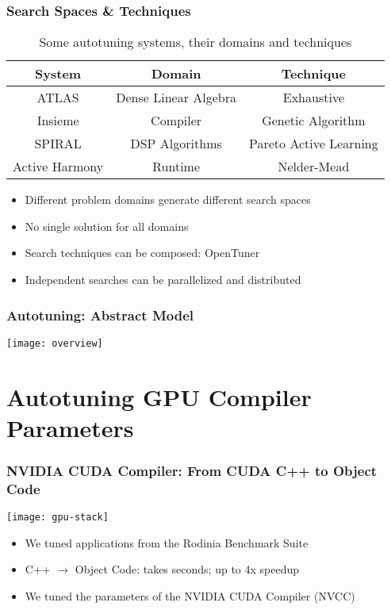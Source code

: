 \documentclass[10pt, compress, aspectratio=169, xcolor=table]{beamer}
\begin{document}
\begin{frame}
    \frametitle{Search Spaces \& Techniques}
    \begin{table}[]
        \centering
        \begin{tabular}{@{}ccc@{}}
            \toprule
            System & Domain & Technique \\ \midrule
            ATLAS & Dense Linear Algebra & Exhaustive \\
            Insieme & Compiler & Genetic Algorithm \\
            SPIRAL & DSP Algorithms & Pareto Active Learning \\
            Active Harmony & Runtime & Nelder-Mead \\ \bottomrule
        \end{tabular}
        \caption{Some autotuning systems, their domains and techniques}
    \end{table}

    \begin{itemize}
        \item Different \alert{problem domains} generate different \alert{search spaces}
        \item \alert{No single solution} for all domains
        \item Search techniques can be composed: \alert{OpenTuner}
        \item Independent searches can be \alert{parallelized and distributed}
    \end{itemize}
\end{frame}

\begin{frame}
    \frametitle{Autotuning: Abstract Model}
    \begin{center}
        \texttt{[image: overview]}
    \end{center}
\end{frame}

\section{Autotuning GPU Compiler Parameters}

\begin{frame}
    \frametitle{NVIDIA CUDA Compiler: From CUDA C++ to Object Code}
    \begin{center}
        \texttt{[image: gpu-stack]}
    \end{center}

    \begin{itemize}
        \item We tuned applications from the \alert{Rodinia Benchmark Suite}
        \item C++ $\rightarrow$ Object Code: takes \alert{seconds}; \alert{up to 4x speedup}
        \item We \alert{tuned the parameters} of the NVIDIA CUDA Compiler (NVCC)
    \end{itemize}
\end{frame}
\end{document}
